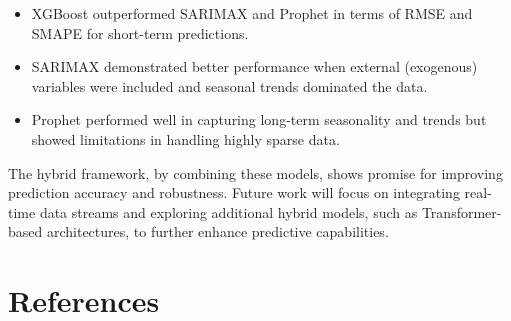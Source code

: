 \documentclass[journal]{IEEEtran}
\begin{document}
\begin{itemize}
    \item XGBoost outperformed SARIMAX and Prophet in terms of RMSE and SMAPE for short-term predictions.
    \item SARIMAX demonstrated better performance when external (exogenous) variables were included and seasonal trends dominated the data.
    \item Prophet performed well in capturing long-term seasonality and trends but showed limitations in handling highly sparse data.
\end{itemize}

The hybrid framework, by combining these models, shows promise for improving prediction accuracy and robustness. Future work will focus on integrating real-time data streams and exploring additional hybrid models, such as Transformer-based architectures, to further enhance predictive capabilities.

\section{References}
\end{document}
